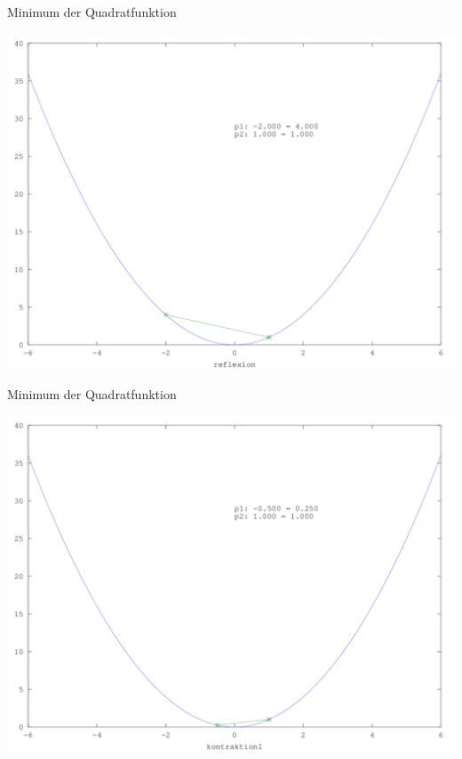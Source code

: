 \documentclass[\outputformat]{beamer}
\begin{document}
\begin{frame}{Minimum der Quadratfunktion}
	\begin{center}
		\includegraphics[height=0.75\paperheight]{../bilder/Quadrat/sinx_x003.png}
	\end{center}
\end{frame}
\begin{frame}{Minimum der Quadratfunktion}
	\begin{center}
		\includegraphics[height=0.75\paperheight]{../bilder/Quadrat/sinx_x004.png}
	\end{center}
\end{frame}
\end{document}
